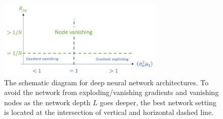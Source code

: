 \begin{figure}
\centering
\includegraphics[width=0.7\textwidth]{"theo"}
\caption{The schematic diagram for deep neural network architectures. To avoid the network from exploding/vanishing gradients and vanishing nodes as the network depth $L$ goes deeper, the best network setting is located at the intersection of vertical and horizontal dashed line.}
\label{fig:sec6_theo1}
\setlength{\belowcaptionskip}{-10pt}
\end{figure}